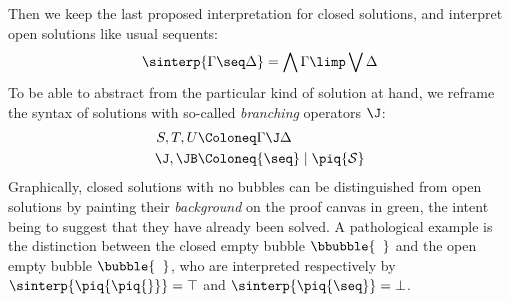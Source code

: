 Then we keep the last proposed interpretation for closed solutions, and
interpret open solutions like usual sequents:
$$\sinterp{\Gamma \seq \Delta} = \bigwedge{\Gamma} \limp \bigvee{\Delta}$$ To be
able to abstract from the particular kind of solution at hand, we reframe the
syntax of solutions with so-called \emph{branching} operators $\J$:
\begin{align*}
  S, T, U &\Coloneq \Gamma \J \Delta \\
  \J, \JB &\Coloneq {\seq} \mid \piq{\mathcal{S}}
\end{align*}
Graphically, closed solutions with no bubbles can be distinguished from open
solutions by painting their \emph{background} on the proof canvas in green, the
intent being to suggest that they have already been solved. A pathological
example is the distinction between the closed empty bubble
$\bbubble{\phantom{a}}$ and the open empty bubble $\bubble{\phantom{a}}$, who
are interpreted respectively by $\sinterp{\piq{\piq{}}} = \top$ and
$\sinterp{\piq{\seq}} = \bot$.

